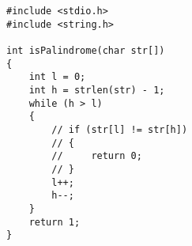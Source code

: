 
\begin{lstlisting}[style=CStyle, caption=Mutant M3 of function isPalindrome., label=isPalindrome_m3]
#include <stdio.h> 
#include <string.h> 

int isPalindrome(char str[]) 
{ 
    int l = 0; 
    int h = strlen(str) - 1; 
    while (h > l) 
    { 
        // if (str[l] != str[h]) 
        // { 
        //     return 0;
        // } 
        l++;
        h--;
    } 
    return 1; 
} 
\end{lstlisting}